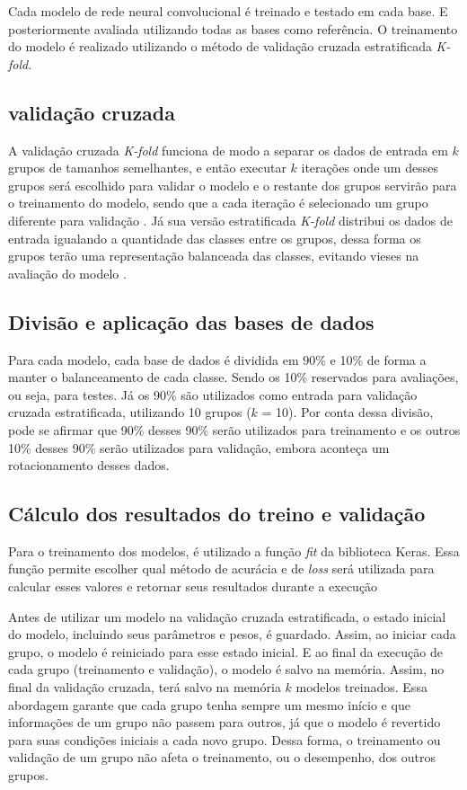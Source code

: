 Cada modelo de rede neural convolucional é treinado e testado em cada base.
E posteriormente avaliada utilizando todas as bases como referência.
O treinamento do modelo é realizado utilizando o método de validação cruzada estratificada \textit{K-fold}.

\subsection{validação cruzada}

A validação cruzada \textit{K-fold} funciona de modo a separar os dados de entrada em $k$ grupos de tamanhos semelhantes, e então executar $k$ iterações onde um desses grupos será escolhido para validar o modelo e o restante dos grupos servirão para o treinamento do modelo, sendo que a cada iteração é selecionado um grupo diferente para validação \cite{kohavi1995study}. 
Já sua versão estratificada \textit{K-fold} distribui os dados de entrada igualando a quantidade das classes entre os grupos, dessa forma os grupos terão uma representação balanceada das classes, evitando vieses na avaliação do modelo \cite{geron2019hands}.

\subsection{Divisão e aplicação das bases de dados}

Para cada modelo, cada base de dados é dividida em 90\% e 10\% de forma a manter o balanceamento de cada classe.
Sendo os 10\% reservados para avaliações, ou seja, para testes.
Já os 90\% são utilizados como entrada para validação cruzada estratificada, utilizando 10 grupos ($k$ = 10).
Por conta dessa divisão, pode se afirmar que 90\% desses 90\% serão utilizados para treinamento e os outros 10\% desses 90\% serão utilizados para validação, embora aconteça um rotacionamento desses dados.


\subsection{Cálculo dos resultados do treino e validação}

Para o treinamento dos modelos, é utilizado a função \textit{fit} da biblioteca Keras.
Essa função permite escolher qual método de acurácia e de \textit{loss} será utilizada para calcular esses valores e retornar seus resultados durante a execução

Antes de utilizar um modelo na validação cruzada estratificada, o estado inicial do modelo, incluindo seus parâmetros e pesos, é guardado. 
Assim, ao iniciar cada grupo, o modelo é reiniciado para esse estado inicial. 
E ao final da execução de cada grupo (treinamento e validação), o modelo é salvo na memória.
Assim, no final da validação cruzada, terá salvo na memória $k$ modelos treinados.
Essa abordagem garante que cada grupo tenha sempre um mesmo início e que informações de um grupo não passem para outros, já que o modelo é revertido para suas condições iniciais a cada novo grupo. 
Dessa forma, o treinamento ou validação de um grupo não afeta o treinamento, ou o desempenho, dos outros grupos.

